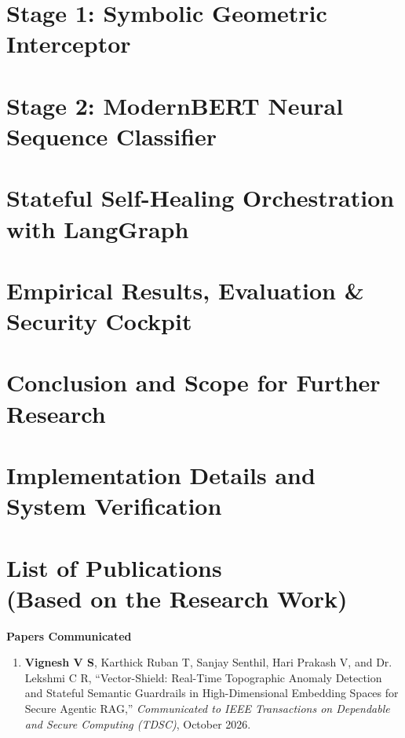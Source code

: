 \documentclass[a4paper, 12pt]{report}
\theoremstyle{definition}
\begin{document}
\chapter{Stage 1: Symbolic Geometric Interceptor}
 

\chapter{Stage 2: ModernBERT Neural Sequence Classifier}


\chapter{Stateful Self-Healing Orchestration with LangGraph}


\chapter{Empirical Results, Evaluation \& Security Cockpit}


\chapter{Conclusion and Scope for Further Research}


\appendix
\chapter{Implementation Details and System Verification}


\newpage
\renewcommand{\bibname}{References}



\chapter*{List of Publications \\ \large(Based on the Research Work)}
\textbf{\Large Papers Communicated}
\begin{enumerate}
	\item \textbf{Vignesh V S}, Karthick Ruban T, Sanjay Senthil, Hari Prakash V, and Dr. Lekshmi C R, \enquote{Vector-Shield: Real-Time Topographic Anomaly Detection and Stateful Semantic Guardrails in High-Dimensional Embedding Spaces for Secure Agentic RAG,} \textit{Communicated to IEEE Transactions on Dependable and Secure Computing (TDSC)}, October 2026.
\end{enumerate}
\end{document}
